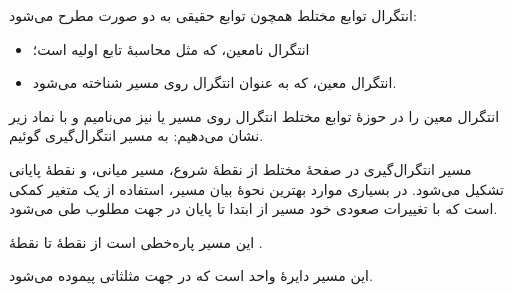 
انتگرال توابع مختلط همچون توابع حقیقی به دو صورت مطرح می‌شود:

\begin{itemize}
\tightlist
\item
  انتگرال نامعین، که مثل محاسبهٔ تابع اولیه است؛
\item
  انتگرال معین، که به عنوان انتگرال روی مسیر شناخته می‌شود.
\end{itemize}

انتگرال معین را در حوزهٔ توابع مختلط انتگرال روی مسیر یا  نیز می‌نامیم و با نماد زیر نشان می‌دهیم:
به  مسیر انتگرال‌گیری گوئیم.



مسیر انتگرال‌گیری در صفحهٔ مختلط از نقطهٔ شروع، مسیر میانی، و نقطهٔ پایانی تشکیل می‌شود. در بسیاری موارد بهترین نحوهٔ بیان مسیر، استفاده از یک متغیر کمکی است که با تغییرات صعودی خود مسیر از ابتدا تا پایان در جهت مطلوب طی می‌شود.



\begin{EMexample}{}

این مسیر پاره‌خطی است از نقطهٔ  تا نقطهٔ .

\end{EMexample}


\begin{EMexample}{}

این مسیر دایرهٔ واحد است که در جهت مثلثاتی پیموده می‌شود.

\end{EMexample}


